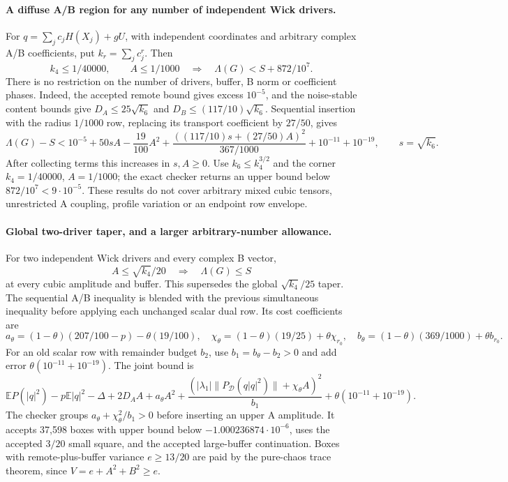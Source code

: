 \paragraph{A diffuse A/B region for any number of independent Wick drivers.}
For $q=\sum_jc_jH(X_j)+gU$, with independent coordinates and arbitrary
complex A/B coefficients, put $k_r=\sum_jc_j^r$. Then
\[
 \boxed{k_4\le1/40000,\qquad A\le1/1000
 \quad\Longrightarrow\quad \Lambda(G)<S+872/10^7.}
\]
There is no restriction on the number of drivers, buffer, B norm or
coefficient phases. Indeed, the accepted remote bound gives excess
$10^{-5}$, and the noise-stable content bounds give
$D_A\le25\sqrt{k_6}$ and $D_B\le(117/10)\sqrt{k_6}$.
Sequential insertion with the radius $1/1000$ row, replacing its
transport coefficient by $27/50$, gives
\[
 \Lambda(G)-S<10^{-5}+50sA-\frac{19}{100}A^2
 +\frac{((117/10)s+(27/50)A)^2}{367/1000}+10^{-11}+10^{-19},
 \qquad s=\sqrt{k_6}.
\]
After collecting terms this increases in $s,A\ge0$.
Use $k_6\le k_4^{3/2}$ and the corner $k_4=1/40000$, $A=1/1000$;
the exact checker returns an upper bound below $872/10^7<9\cdot10^{-5}$.
These results do not cover arbitrary mixed cubic tensors, unrestricted
A coupling, profile variation or an endpoint row envelope.

\paragraph{Global two-driver taper, and a larger arbitrary-number allowance.}
For two independent Wick drivers and every complex B vector,
\[
 \boxed{A\le\sqrt{k_4}/20\quad\Longrightarrow\quad\Lambda(G)\le S}
\]
at every cubic amplitude and buffer. This supersedes the global
$\sqrt{k_4}/25$ taper. The sequential A/B inequality is blended with
the previous simultaneous inequality before applying each unchanged
scalar dual row. Its cost coefficients are
\[
 a_\theta=(1-\theta)(207/100-p)-\theta(19/100),\quad
 \chi_\theta=(1-\theta)(19/25)+\theta\chi_{r_0},\quad
 b_\theta=(1-\theta)(369/1000)+\theta b_{r_0}.
\]
For an old scalar row with remainder budget $b_2$, use
$b_1=b_\theta-b_2>0$ and add error
$\theta(10^{-11}+10^{-19})$. The joint bound is
\[
 \mathbb E P(|q|^2)-p\mathbb E|q|^2-\Delta
 +2D_AA+a_\theta A^2
 +\frac{(|\lambda_1|\|P_{\mathcal D}(q|q|^2)\|+\chi_\theta A)^2}{b_1}
 +\theta(10^{-11}+10^{-19}).
\]
The checker groups $a_\theta+\chi_\theta^2/b_1>0$ before inserting an
upper A amplitude. It accepts 37,598 boxes with upper bound below
$-1.000236874\cdot10^{-6}$, uses the accepted $3/20$ small square,
and the accepted large-buffer continuation. Boxes with remote-plus-buffer
variance $e\ge13/20$ are paid by the pure-chaos trace theorem, since
$V=e+A^2+B^2\ge e$.

